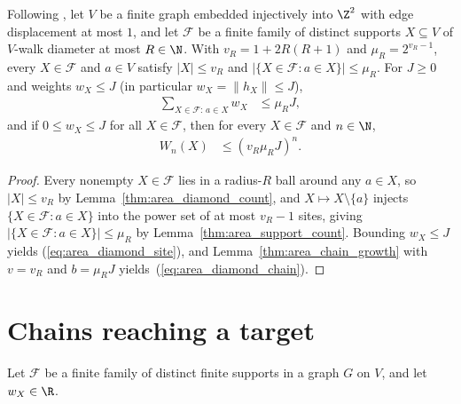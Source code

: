 \begin{theorem}
    \label{thm:area_diamond_budget}
    \leanok
    Following \cite[Sections~2 and~4]{OpenAI2026AreaLaw}, let $V$ be a finite
    graph embedded injectively into $\Z^2$ with edge displacement at most $1$,
    and let $\mathcal F$ be a finite family of distinct supports $X\subseteq V$
    of $V$-walk diameter at most $R\in\N$. With $v_R=1+2R(R+1)$ and
    $\mu_R=2^{v_R-1}$, every $X\in\mathcal F$ and $a\in V$ satisfy
    $|X|\le v_R$ and $|\{X\in\mathcal F:a\in X\}|\le\mu_R$. For $J\ge0$ and
    weights $w_X\le J$ (in particular $w_X=\lVert h_X\rVert\le J$),
    \begin{align}
        \sum_{X\in\mathcal F:\,a\in X}w_X & \le\mu_RJ,
        \label{eq:area_diamond_site}
    \end{align}
    and if $0\le w_X\le J$ for all $X\in\mathcal F$, then for every
    $X\in\mathcal F$ and $n\in\N$,
    \begin{align}
        W_n(X) & \le(v_R\mu_RJ)^n.
        \label{eq:area_diamond_chain}
    \end{align}
\end{theorem}
\begin{proof}
    \leanok
    Every nonempty $X\in\mathcal F$ lies in a radius-$R$ ball around any
    $a\in X$, so $|X|\le v_R$ by Lemma~\ref{thm:area_diamond_count}, and
    $X\mapsto X\setminus\{a\}$ injects $\{X\in\mathcal F:a\in X\}$ into the
    power set of at most $v_R-1$ sites, giving
    $|\{X\in\mathcal F:a\in X\}|\le\mu_R$ by
    Lemma~\ref{thm:area_support_count}. Bounding $w_X\le J$ yields
    (\ref{eq:area_diamond_site}), and Lemma~\ref{thm:area_chain_growth}
    with $v=v_R$ and $b=\mu_RJ$ yields~(\ref{eq:area_diamond_chain}).
\end{proof}

\section{Chains reaching a target}

Let $\mathcal F$ be a finite family of distinct finite supports in a graph $G$
on $V$, and let $w_X\in\R$.

